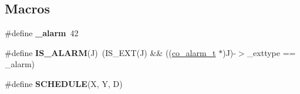 \subsection*{Macros}
\begin{DoxyCompactItemize}
\item 
\hypertarget{serval-dna_8c_a14e0b93876e52cc552f15e115574a5f7}{\#define {\bfseries \-\_\-alarm}~42}\label{serval-dna_8c_a14e0b93876e52cc552f15e115574a5f7}

\item 
\hypertarget{serval-dna_8c_a424c673123b463e7d8bdd369464d4ca3}{\#define {\bfseries I\-S\-\_\-\-A\-L\-A\-R\-M}(J)~(I\-S\-\_\-\-E\-X\-T(J) \&\& ((\hyperlink{structco__alarm__t}{co\-\_\-alarm\-\_\-t} $\ast$)J)-\/$>$\-\_\-exttype == \-\_\-alarm)}\label{serval-dna_8c_a424c673123b463e7d8bdd369464d4ca3}

\item 
\#define {\bfseries S\-C\-H\-E\-D\-U\-L\-E}(X, Y, D)
\end{DoxyCompactItemize}
